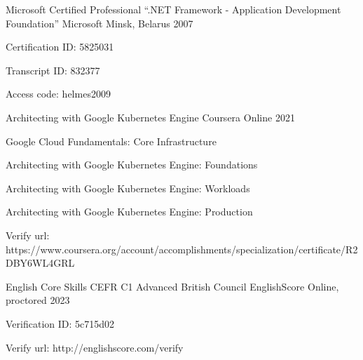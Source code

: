 

\begin{cventries}

  \cventry
   {Microsoft Certified Professional “.NET Framework - Application Development Foundation”} %
   {Microsoft} %
   {Minsk, Belarus} %
   {2007} %
   {
     \begin{cvitems} %
       \item {Certification ID: 5825031}
       \item {Transcript ID: 832377}
       \item {Access code: helmes2009}
     \end{cvitems}
   }

  \cventry
   {Architecting with Google Kubernetes Engine} %
   {Coursera} %
   {Online} %
   {2021} %
   {
     \begin{cvitems} %
       \item {Google Cloud Fundamentals: Core Infrastructure}
       \item {Architecting with Google Kubernetes Engine: Foundations}
       \item {Architecting with Google Kubernetes Engine: Workloads}
       \item {Architecting with Google Kubernetes Engine: Production}
       \item {Verify url: https://www.coursera.org/account/accomplishments/specialization/certificate/R2DBY6WL4GRL}
     \end{cvitems}
   }

  \cventry
   {English Core Skills CEFR C1 Advanced} %
   {British Council EnglishScore} %
   {Online, proctored} %
   {2023} %
   {
     \begin{cvitems} %
       \item {Verification ID: 5c715d02}
       \item {Verify url: http://englishscore.com/verify}
     \end{cvitems}
   }

\end{cventries}
